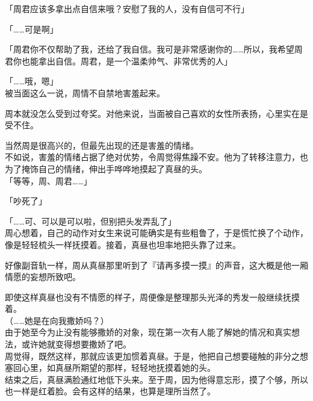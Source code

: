「周君应该多拿出点自信来哦？安慰了我的人，没有自信可不行」

「……可是啊」

「周君你不仅帮助了我，还给了我自信。我可是非常感谢你的……所以，我希望周君你也能拿出自信。周君，是一个温柔帅气、非常优秀的人」

「……哦，嗯」\\

被当面这么一说，周情不自禁地害羞起来。

周本就没怎么受到过夸奖。对他来说，当面被自己喜欢的女性所表扬，心里实在是受不住。

当然周是很高兴的，但最先出现的还是害羞的情绪。\\

不如说，害羞的情绪占据了绝对优势，令周觉得焦躁不安。他为了转移注意力，也为了掩饰自己的情绪，伸出手哗哗地摸起了真昼的头。\\

「等等，周、周君……」

「吵死了」

「……可、可以是可以啦，但别把头发弄乱了」\\

周心想着，自己的动作对女生来说可能确实是有些粗鲁了，于是慌忙换了个动作，像是轻轻梳头一样抚摸着。接着，真昼也坦率地把头靠了过来。

好像副音轨一样，周从真昼那里听到了『请再多摸一摸』的声音，这大概是他一厢情愿的妄想所致吧。

即使这样真昼也没有不情愿的样子，周便像是整理那头光泽的秀发一般继续抚摸着。\\

（……她是在向我撒娇吗？）\\

由于她至今为止没有能够撒娇的对象，现在第一次有人能了解她的情况和真实想法，或许她就变得想要撒娇了吧。\\

周觉得，既然这样，那就应该更加惯着真昼。于是，他把自己想要碰触的非分之想塞回心里，如真昼所期望的那样，轻轻地抚摸着她的头。\\

结束之后，真昼满脸通红地低下头来。至于周，因为他得意忘形，摸了个够，所以也一样是红着脸。会有这样的结果，也算是理所当然了。
